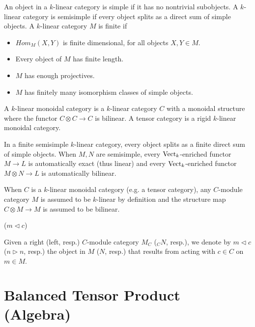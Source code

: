 \begin{definition} \cite{egno/tensor-cats}
  An object in a $k$-linear category is simple if it has no nontrivial
  subobjects. A $k$-linear category is semisimple if every object splits as a
  direct sum of simple objects. A $k$-linear category $M$ is finite if

  \begin{itemize}
    \item $Hom_M(X,Y)$ is finite dimensional, for all objects $X,Y\in M$.
    \item Every object of $M$ has finite length.
    \item $M$ has enough projectives.
    \item $M$ has finitely many isomorphism classes of simple objects.
  \end{itemize}
  A $k$-linear monoidal category is a $k$-linear category $C$ with a monoidal
  structure where the functor $C\otimes C\to C$ is bilinear. A tensor category
  is a rigid $k$-linear monoidal category.
\end{definition}

\noindent In a finite semisimple $k$-linear category, every object splits as a
finite direct sum of simple objects. When $M,N$ are semisimple, every
$\operatorname{Vect}_{k}$-enriched functor $M\to L$ is automatically exact (thus linear) and
every $\operatorname{Vect}_{k}$-enriched functor $M\otimes N\to L$ is automatically
bilinear.

\begin{assumption}
When $C$ is a $k$-linear monoidal category (e.g. a tensor category), any
$C$-module category $M$ is assumed to be $k$-linear by definition and the
structure map $C\otimes M\to M$ is assumed to be bilinear.
\end{assumption}

\begin{notation} ($m \lhd c$)

Given a right (left, resp.) $C$-module category $M_C$ ($_{C}N$, resp.), we
denote by $m\lhd c$ ($n \rhd n$, resp.) the object in $M$ ($N$, resp.) that
results from acting with $c\in C$ on $m\in M$.

\end{notation}



\section{Balanced Tensor Product (Algebra)}\label{section/balanced-tensor-product}

